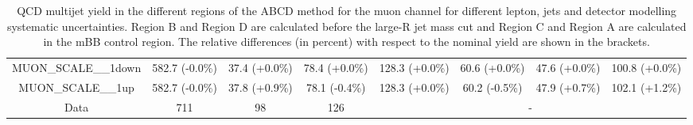 \begin{table}[htbp!]
\begin{tiny}
\begin{center}
\begin{tabular}{c|c|c|c||c|c|c|c}
MUON\_SCALE\_\_1down                                         & 582.7     (-0.0\%) & 37.4      (+0.0\%) & 78.4      (+0.0\%) & 128.3     (+0.0\%) & 60.6      (+0.0\%) & 47.6      (+0.0\%) & 100.8     (+0.0\%) \\ 
MUON\_SCALE\_\_1up                                           & 582.7     (-0.0\%) & 37.8      (+0.9\%) & 78.1      (-0.4\%) & 128.3     (+0.0\%) & 60.2      (-0.5\%) & 47.9      (+0.7\%) & 102.1     (+1.2\%) \\  
\hline 
\hline 
Data                                                        & 711  & 98   & 126 &\multicolumn{4}{c}{-} \\ 
\hline
\end{tabular}
\end{center}
\caption{QCD multijet yield in the different regions of the ABCD method for the muon channel for 
different lepton, jets and \met detector modelling systematic uncertainties. Region B and Region D are calculated before the large-R jet mass cut 
and Region C and Region A are calculated in the mBB control region. The relative differences (in percent) with respect to the nominal yield are shown in the 
brackets.}
\label{tab:boosted_qcd_detsyst_muon_mbbcr_1}
\end{tiny}
\end{table} 
%
%

